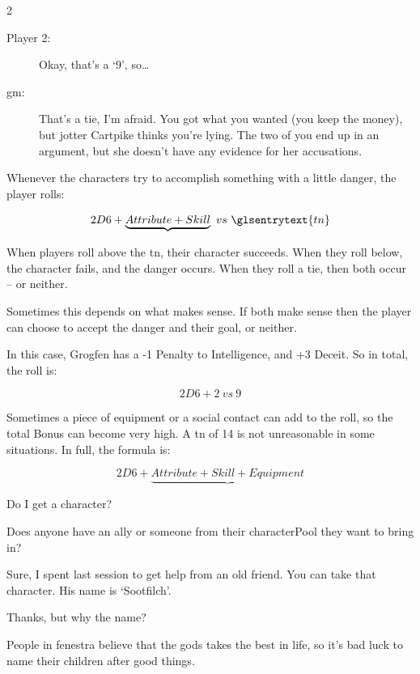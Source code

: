 \begin{multicols}{2}
\begin{description}
  \item[Player 2:]  Okay, that's a `9', so\ldots
  \item[\Gls{gm}:]
  That's a tie, I'm afraid.  You got what you wanted (you keep the money), but
  \Gls{jotter} Cartpike thinks you're lying.  The two of you end up in an
  argument, but she doesn't have any evidence for her accusations.
\end{description}

\bigLine

\noindent
Whenever the characters try to accomplish something with a little
danger, the player rolls:

$$2D6 + \underbrace{Attribute + Skill} ~vs~ \glsentrytext{tn}$$

\noindent
When players roll above the \gls{tn}, their character succeeds.  When they roll
below, the character fails, and the danger occurs.  When they roll a tie, then
both occur -- or neither.

Sometimes this depends on what makes sense.  If both make sense then the player
can choose to accept the danger and their goal, or neither.

In this case, Grogfen has a -1 Penalty to Intelligence, and +3 Deceit.  So in
total, the roll is:

$$2D6 + 2 ~vs~ 9$$

\noindent Sometimes a piece of equipment or a social contact can add to the
roll, so the total Bonus can become very high.  A \gls{tn} of 14 is not
unreasonable in some situations.  In full, the formula is:

$$2D6 + \underbrace{Attribute + Skill + Equipment}$$

\bigLine

\begin{description}\sffamily
  \item[Player 3:] Do I get a character?
  \item[\Gls{gm}:]
  Does anyone have an ally or someone from their \gls{characterPool} they want to
  bring in?

  \item[Player 1:] Sure, I spent  last session to get
  help from an old friend.  You can take that character.  His name is
  `Sootfilch'.

  \item[Player 3:] Thanks, but why the name?

  \item[\Gls{gm}:] People in \gls{fenestra} believe that the gods takes the
  best in life, so it's bad luck to name their children after good things.


\end{description}
\end{multicols}
